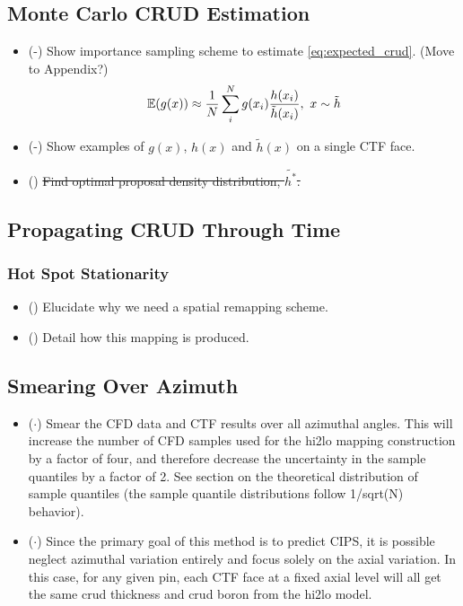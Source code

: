 \subsection{Monte Carlo CRUD Estimation}

\begin{itemize}
        \item (\checkmark-) Show importance sampling scheme to estimate \ref{eq:expected_crud}.  (Move to Appendix?)
        \begin{equation}
        \operatorname*{\mathbb{E}}(g(x)) \approx \frac{1}{N} \sum_i^N g(x_i) \frac{h(x_i)}{\tilde h(x_i)}, \ x \sim \tilde{h}
        \end{equation}
        \item (\checkmark-) Show examples of $g(x)$, $h(x)$ and $\tilde h(x)$ on a single CTF face.
        \item (\xmark) \sout{Find optimal proposal density distribution, $\tilde{h^*}$.}
\end{itemize}


\subsection{Propagating CRUD Through Time}
\subsubsection{Hot Spot Stationarity}
\begin{itemize}
        \item (\checkmark) Elucidate why we need a spatial remapping scheme.
        \item (\checkmark) Detail how this mapping is produced.
\end{itemize}

\subsection{Smearing Over Azimuth}

\begin{itemize}
        \item ($\cdot$) Smear the CFD data and CTF results over all azimuthal angles.  This will increase the number of CFD samples used for the hi2lo mapping construction by a factor of four, and therefore decrease the uncertainty in the sample quantiles by a factor of 2.  See section on the theoretical distribution of sample quantiles (the sample quantile distributions follow 1/sqrt(N) behavior).
        \item ($\cdot$) Since the primary goal of this method is to predict CIPS, it is possible neglect azimuthal variation entirely and focus solely on the axial variation.  In this case, for any given pin, each CTF face at a fixed axial level will all get the same crud thickness and crud boron from the hi2lo model.
\end{itemize}
